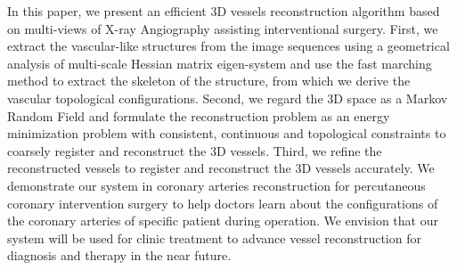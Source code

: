 In this paper, we present an efficient 3D vessels reconstruction algorithm
based on multi-views of X-ray Angiography assisting interventional surgery.
First, we extract the vascular-like structures from the image sequences
using a geometrical analysis of multi-scale Hessian matrix eigen-system and
use the fast marching method to extract the skeleton of the structure, from
which we derive the vascular topological configurations. Second, we regard
the 3D space as a Markov Random Field and formulate the reconstruction
problem as an energy minimization problem with consistent, continuous and
topological constraints to coarsely register and reconstruct the 3D vessels.
Third, we refine the reconstructed vessels to register and reconstruct the
3D vessels accurately. We demonstrate our system in coronary arteries
reconstruction for percutaneous coronary intervention surgery to help
doctors learn about the configurations of the coronary arteries of specific
patient during operation. We envision that our system will be used for
clinic treatment to advance vessel reconstruction for diagnosis and therapy
in the near future.
